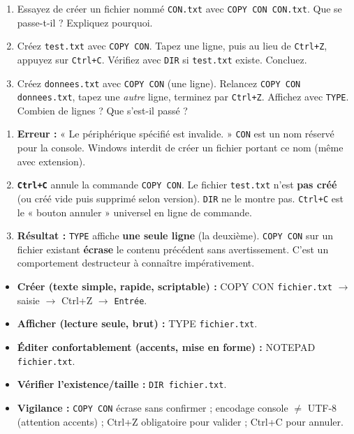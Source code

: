 \documentclass[11pt]{article}
\newcommand{\cle}[1]{{\popxbold\color{popdark}#1}}
\begin{document}
\begin{exercice}
\begin{enumerate}
    \item Essayez de créer un fichier nommé \texttt{CON.txt} avec \texttt{COPY CON CON.txt}. Que se passe-t-il ? Expliquez pourquoi.
    \item Créez \texttt{test.txt} avec \texttt{COPY CON}. Tapez une ligne, puis au lieu de \texttt{Ctrl+Z}, appuyez sur \texttt{Ctrl+C}. Vérifiez avec \texttt{DIR} si \texttt{test.txt} existe. Concluez.
    \item Créez \texttt{donnees.txt} avec \texttt{COPY CON} (une ligne). Relancez \texttt{COPY CON donnees.txt}, tapez une \emph{autre} ligne, terminez par \texttt{Ctrl+Z}. Affichez avec \texttt{TYPE}. Combien de lignes ? Que s'est-il passé ?
\end{enumerate}
\end{exercice}

\begin{corrige}[Exercice 2]
\begin{enumerate}
    \item \textbf{Erreur :} « Le périphérique spécifié est invalide. » \texttt{CON} est un nom réservé pour la console. Windows interdit de créer un fichier portant ce nom (même avec extension).
    \item \textbf{\texttt{Ctrl+C}} annule la commande \texttt{COPY CON}. Le fichier \texttt{test.txt} n'est \textbf{pas créé} (ou créé vide puis supprimé selon version). \texttt{DIR} ne le montre pas. \texttt{Ctrl+C} est le « bouton annuler » universel en ligne de commande.
    \item \textbf{Résultat :} \texttt{TYPE} affiche \textbf{une seule ligne} (la deuxième). \texttt{COPY CON} sur un fichier existant \textbf{écrase} le contenu précédent sans avertissement. C'est un comportement destructeur à connaître impérativement.
\end{enumerate}
\end{corrige}

\begin{aretenir}
\begin{itemize}
    \item \textbf{Créer (texte simple, rapide, scriptable) :} \cle{COPY CON} \texttt{fichier.txt} $\to$ saisie $\to$ \cle{Ctrl+Z} $\to$ \texttt{Entrée}.
    \item \textbf{Afficher (lecture seule, brut) :} \cle{TYPE} \texttt{fichier.txt}.
    \item \textbf{Éditer confortablement (accents, mise en forme) :} \cle{NOTEPAD} \texttt{fichier.txt}.
    \item \textbf{Vérifier l'existence/taille :} \texttt{DIR fichier.txt}.
    \item \textbf{Vigilance :} \texttt{COPY CON} écrase sans confirmer ; \cle{encodage} console $\neq$ \cle{UTF-8} (attention accents) ; \cle{Ctrl+Z} obligatoire pour valider ; \cle{Ctrl+C} pour annuler.
\end{itemize}
\end{aretenir}
\end{document}
